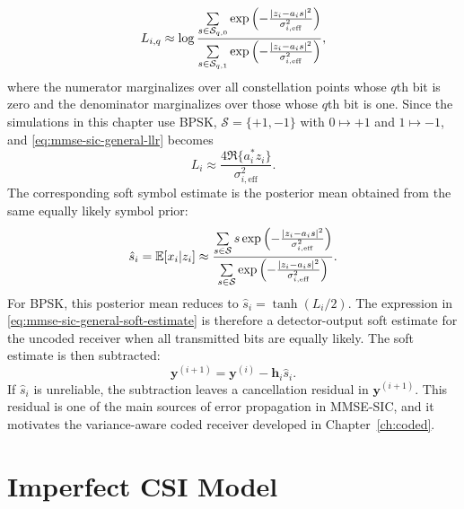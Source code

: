 \begin{equation}
    L_{i,q}
    \approx
    \log
    \frac{
    \sum\limits_{s\in\mathcal{S}_{q,0}}
    \exp\left(-\frac{\left\lvert z_i-a_i s \right\rvert^2}{\sigma^2_{i,\mathrm{eff}}}\right)}
    {\sum\limits_{s\in\mathcal{S}_{q,1}}
    \exp\left(-\frac{\left\lvert z_i-a_i s \right\rvert^2}{\sigma^2_{i,\mathrm{eff}}}\right)},
    \label{eq:mmse-sic-general-llr}
\end{equation}
where the numerator marginalizes over all constellation points whose $q$th bit is zero and the denominator marginalizes over those whose $q$th bit is one. Since the simulations in this chapter use BPSK, $\mathcal{S}=\{+1,-1\}$ with $0\mapsto +1$ and $1\mapsto -1$, and \eqref{eq:mmse-sic-general-llr} becomes
\begin{equation}
    L_i
    \approx
    \frac{4\Re\{a_i^* z_i\}}{\sigma^2_{i,\mathrm{eff}}}.
\end{equation}
The corresponding soft symbol estimate is the posterior mean obtained from the same equally likely symbol prior:
\begin{equation}
    \hat{s}_i
    =
    \mathbb{E}[x_i|z_i]
    \approx
    \frac{
    \sum\limits_{s\in\mathcal{S}} s
    \exp\left(-\frac{\left\lvert z_i-a_i s \right\rvert^2}{\sigma^2_{i,\mathrm{eff}}}\right)}
    {
    \sum\limits_{s\in\mathcal{S}}
    \exp\left(-\frac{\left\lvert z_i-a_i s \right\rvert^2}{\sigma^2_{i,\mathrm{eff}}}\right)}.
    \label{eq:mmse-sic-general-soft-estimate}
\end{equation}
For BPSK, this posterior mean reduces to $\hat{s}_i=\tanh(L_i/2)$. The expression in \eqref{eq:mmse-sic-general-soft-estimate} is therefore a detector-output soft estimate for the uncoded receiver when all transmitted bits are equally likely. The soft estimate is then subtracted:
\begin{equation}
    \bm{y}^{(i+1)}=\bm{y}^{(i)}-\bm{h}_i\hat{s}_i .
\end{equation}
If $\hat{s}_i$ is unreliable, the subtraction leaves a cancellation residual in $\bm{y}^{(i+1)}$. This residual is one of the main sources of error propagation in MMSE-SIC, and it motivates the variance-aware coded receiver developed in Chapter~\ref{ch:coded}.


\section{Imperfect CSI Model}


